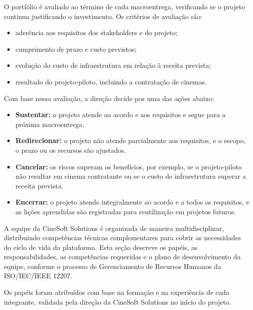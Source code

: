 
O portfólio é avaliado ao término de cada macroentrega, verificando se o projeto continua justificando o investimento. Os critérios de avaliação são:

\begin{itemize}
\item aderência aos requisitos dos stakeholders e do projeto;
\item cumprimento de prazo e custo previstos;
\item evolução do custo de infraestrutura em relação à receita prevista;
\item resultado do projeto-piloto, incluindo a contratação de cinemas.
\end{itemize}

Com base nessa avaliação, a direção decide por uma das ações abaixo:

\begin{itemize}
\item \textbf{Sustentar:} o projeto atende ao acordo e aos requisitos e segue para a próxima macroentrega.
\item \textbf{Redirecionar:} o projeto não atende parcialmente aos requisitos, e o escopo, o prazo ou os recursos são ajustados.
\item \textbf{Cancelar:} os riscos superam os benefícios, por exemplo, se o projeto-piloto não resultar em cinema contratante ou se o custo de infraestrutura superar a receita prevista.
\item \textbf{Encerrar:} o projeto atende integralmente ao acordo e a todos os requisitos, e as lições aprendidas são registradas para reutilização em projetos futuros.
\end{itemize}


A equipe da CineSoft Solutions é organizada de maneira multidisciplinar, distribuindo competências técnicas complementares para cobrir as necessidades do ciclo de vida da plataforma. Esta seção descreve os papéis, as responsabilidades, as competências requeridas e o plano de desenvolvimento da equipe, conforme o processo de Gerenciamento de Recursos Humanos da ISO/IEC/IEEE 12207.


Os papéis foram atribuídos com base na formação e na experiência de cada integrante, validada pela direção da CineSoft Solutions no início do projeto.

